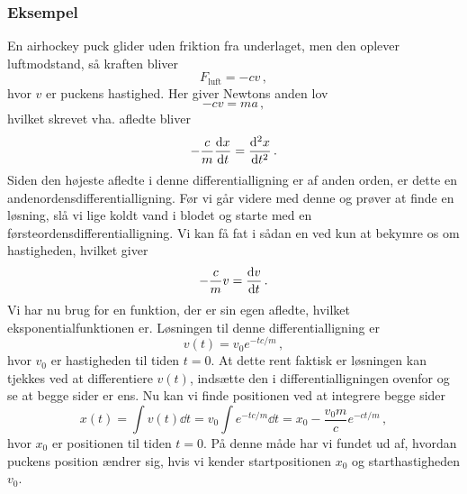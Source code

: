 \subsubsection{Eksempel}
En airhockey puck glider uden friktion fra underlaget, men den oplever luftmodstand, så kraften bliver
$$
F_\text{luft}=-cv \, ,
$$
hvor $v$ er puckens hastighed. Her giver Newtons anden lov
\begin{equation}
-cv=ma \, ,
\end{equation}
hvilket skrevet vha. afledte bliver
\begin{equation}
 -\frac{c}{m}\dv{x}{t} = \dv[2]{x}{t} \, .
\end{equation}
Siden den højeste afledte i denne differentialligning er af anden orden, er dette en andenordensdifferentialligning.
Før vi går videre med denne og prøver at finde en løsning, slå vi lige koldt vand i blodet og starte med en førsteordensdifferentialligning. Vi kan få fat i sådan en ved kun at bekymre os om hastigheden, hvilket giver
\begin{equation}
-\frac{c}{m}v=\dv{v}{t} \, .
\end{equation}
Vi har nu brug for en funktion, der er sin egen afledte, hvilket eksponentialfunktionen er. Løsningen til denne differentialligning er
\begin{equation}
v(t)=v_0e^{-tc/m} \, ,
\end{equation}
hvor $v_0$ er hastigheden til tiden $t=0$. At dette rent faktisk er løsningen kan tjekkes ved at differentiere $v(t)$, indsætte den i differentialligningen ovenfor og se at begge sider er ens.
Nu kan vi finde positionen ved at integrere begge sider
\begin{equation}
x(t)= \int v(t) \dd{t} = v_0\int e^{-tc/m}\dd{t}=x_0-\frac{v_0m}{c}e^{-ct/m} \, ,
\end{equation}
hvor $x_0$ er positionen til tiden $t=0$. På denne måde har vi fundet ud af, hvordan puckens position ændrer sig, hvis vi kender startpositionen $x_0$ og starthastigheden $v_0$.\\

